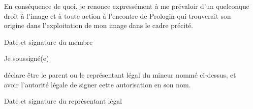 \documentclass[a4paper,12pt]{prologin}
\begin{document}
En conséquence de quoi, je renonce expressément à me prévaloir d'un
quelconque droit à l'image et à toute action à l'encontre de Prologin qui
trouverait son origine dans l'exploitation de mon image dans le cadre précité.

\begin{signatureframe}{Date et signature du membre}\end{signatureframe}

\begin{legalrepframe}[title=À remplir par le représentant légal si le membre est mineur]
Je soussigné(e) \hrulefill

déclare être le parent ou le représentant légal du mineur nommé
ci-dessus, et avoir l'autorité légale de signer cette autorisation en son nom.

\begin{signatureframe}{Date et signature du représentant légal}\end{signatureframe}
\end{legalrepframe}
\end{document}
